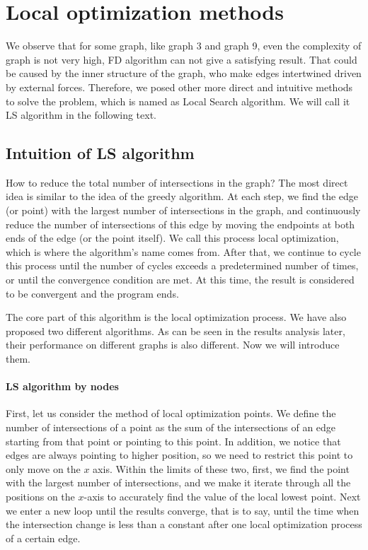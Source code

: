 \section{Local optimization methods}
\label{chapter 4}

\textit{}
We observe that for some graph, like graph 3 and graph 9, even the complexity of graph is not very high, FD algorithm can not give a satisfying result. That could be caused by the inner structure of the graph, who make edges intertwined driven by external forces. Therefore, we posed other more direct and intuitive methods to solve the problem, which is named as Local Search algorithm. We will call it LS algorithm in the following text. 


\subsection{Intuition of LS algorithm}

How to reduce the total number of intersections in the graph? The most direct idea is similar to the idea of the greedy algorithm. At each step, we find the edge (or point) with the largest number of intersections in the graph, and continuously reduce the number of intersections of this edge by moving the endpoints at both ends of the edge (or the point itself). We call this process local optimization, which is where the algorithm's name comes from. After that, we continue to cycle this process until the number of cycles exceeds a predetermined number of times, or until the convergence condition are met. At this time, the result is considered to be convergent and the program ends.

The core part of this algorithm is the local optimization process. We have also proposed two different algorithms. As can be seen in the results analysis later, their performance on different graphs is also different. Now we will introduce them.

\paragraph{LS algorithm by nodes}

First, let us consider the method of local optimization points. We define the number of intersections of a point as the sum of the intersections of an edge starting from that point or pointing to this point. In addition, we notice that edges are always pointing to higher position, so we need to restrict this point to only move on the $x$ axis. Within the limits of these two, first, we find the point with the largest number of intersections, and we make it iterate through all the positions on the $x$-axis to accurately find the value of the local lowest point. Next we enter a new loop until the results converge, that is to say, until the time when the intersection change is less than a constant after one local optimization process of a certain edge.

